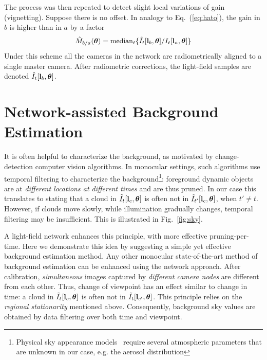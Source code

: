 \documentclass[runningheads]{llncs}
\begin{document}
The process was then repeated to detect slight local variations of gain (vignetting). Suppose there is no offset. In analogy to Eq.~(\ref{eq:hato}), the gain in $b$ is higher than in $a$ by a factor
\begin{equation}
 {\hat M}_{b/a}({\bm \theta})=
  {\rm median}_{t} \{\tilde I_t[{\bf l}_b,{\bm \theta}]/I_t[{\bf l}_a,{\bm \theta}]\}
 \label{eq:hatm}
\end{equation}
Under this scheme all the cameras in the network are radiometrically aligned to a single master camera.
After radiometric corrections, the light-field samples are denoted $\hat I_t[{\bf l}_b,{\bm \theta}]$.


\section{Network-assisted Background Estimation}
\label{sec:background}

It is often helpful to characterize the background, as motivated by change-detection computer vision algorithms. In monocular settings, such algorithms use temporal filtering to characterize the background\footnote{Physical sky appearance models~\cite{hosek2012analytic} require several atmospheric parameters that are unknown in our case, e.g. the aerosol distribution}: foreground dynamic objects are at {\em different locations at different times} and are thus pruned. In our case this translates to stating that a cloud in
$\tilde I_t[{\bf l}_c,{\bm \theta}]$ is often not in
$\tilde I_{t'}[{\bf l}_c,{\bm \theta}]$, when $t'\neq t$. However, if clouds move slowly, while illumination gradually changes, temporal filtering may be insufficient. This is illustrated in Fig.~\ref{fig:sky}.

A light-field network enhances this principle, with more effective pruning-per-time. Here we demonstrate this idea by suggesting a simple yet effective background estimation method. Any other monocular state-of-the-art method of background estimation can be enhanced using the network approach. After calibration, {\em simultaneous} images captured by {\em different camera nodes} are different from each other. Thus, change of viewpoint has an effect similar to change in time: a cloud in
$\tilde I_t[{\bf l}_c,{\bm \theta}]$ is often not in $\tilde I_t[{\bf l}_{c'},{\bm \theta}]$. This principle relies on the {\em regional stationarity} mentioned above. Consequently, background sky values are obtained by data filtering over both time and viewpoint.
\end{document}

